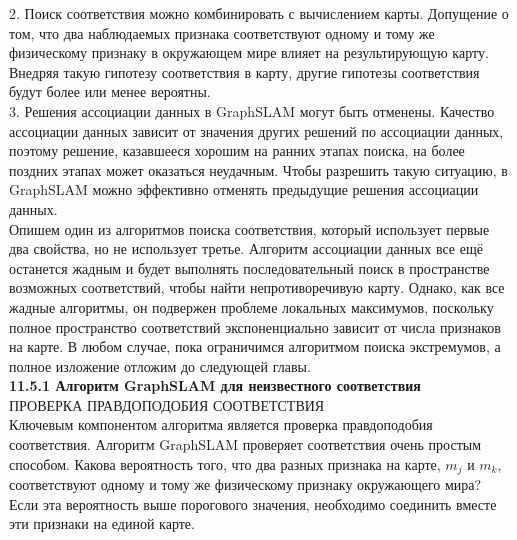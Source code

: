 \documentclass[10pt,a4paper]{article}
\begin{document}
2.	Поиск соответствия можно комбинировать с вычислением карты. Допущение о том, что два наблюдаемых признака соответствуют одному и тому же физическому признаку в окружающем мире влияет на результирующую карту. Внедряя такую гипотезу соответствия в карту, другие гипотезы соответствия будут более или менее вероятны.\\

3.	Решения ассоциации данных в GraphSLAM могут быть отменены. Качество ассоциации данных зависит от значения других решений по ассоциации данных, поэтому решение, казавшееся хорошим на ранних этапах поиска, на более поздних этапах может оказаться неудачным. Чтобы разрешить такую ситуацию, в GraphSLAM можно эффективно отменять предыдущие решения ассоциации данных.\\

Опишем один из алгоритмов поиска соответствия, который использует первые два свойства, но не использует третье. Алгоритм ассоциации данных все ещё останется жадным и будет выполнять последовательный поиск в пространстве возможных соответствий, чтобы найти непротиворечивую карту. Однако, как все жадные алгоритмы, он подвержен проблеме локальных максимумов, поскольку полное пространство соответствий экспоненциально зависит от числа признаков на карте. В любом случае, пока ограничимся алгоритмом поиска экстремумов, а полное изложение отложим до следующей главы.\\

\textbf{11.5.1	Алгоритм GraphSLAM для неизвестного соответствия}\\

ПРОВЕРКА ПРАВДОПОДОБИЯ СООТВЕТСТВИЯ\\

Ключевым компонентом алгоритма является проверка правдоподобия соответствия.
Алгоритм GraphSLAM проверяет соответствия очень простым способом. Какова вероятность того, что два разных признака на карте, $m_j$ и $m_k$, соответствуют одному и тому же физическому признаку окружающего мира? Если эта вероятность выше порогового значения, необходимо соединить вместе эти признаки на единой карте. 
\end{document}
